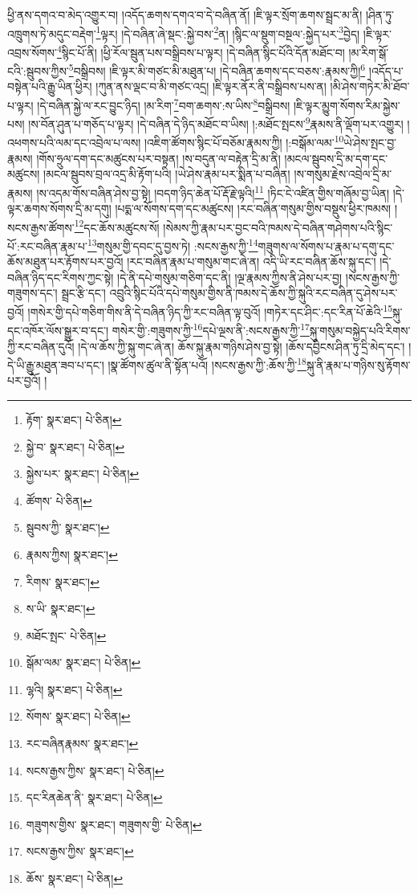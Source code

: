 ཕྱི་ནས་དགའ་བ་མེད་འགྱུར་བ། །འདོད་ཆགས་དགའ་བ་དེ་བཞིན་ནོ། །ཇི་ལྟར་སྲོག་ཆགས་སྦྲང་མ་ནི། །ཤིན་ཏུ་འཁྲུགས་ཏེ་མདུང་བརྡེག་\footnote{རྟོག་  སྣར་ཐང་།  པེ་ཅིན། }ལྟར། །དེ་བཞིན་ཞེ་སྡང་:སྐྱེ་བས་\footnote{སྐྱེ་བ་  སྣར་ཐང་།  པེ་ཅིན། }ན། །སྙིང་ལ་སྡུག་བསྔལ་:སྐྱེད་པར་\footnote{སྐྱེས་པར་  སྣར་ཐང་།  པེ་ཅིན། }བྱེད། །ཇི་ལྟར་འབྲས་སོགས་\footnote{ཚོགས་  པེ་ཅིན། }སྙིང་པོ་ནི། །ཕྱི་རོལ་སྦུན་པས་བསྒྲིབས་པ་ལྟར། །དེ་བཞིན་སྙིང་པོའི་དོན་མཐོང་བ། །མ་རིག་སྒོ་ངའི་:སྦུབས་ཀྱིས་\footnote{སྦུབས་ཀྱི་  སྣར་ཐང་། }བསྒྲིབས། །ཇི་ལྟར་མི་གཙང་མི་མཐུན་པ། །དེ་བཞིན་ཆགས་དང་བཅས་:རྣམས་ཀྱི།\footnote{རྣམས་ཀྱིས།  སྣར་ཐང་། } །འདོད་པ་བསྟེན་པའི་རྒྱུ་ཡིན་ཕྱིར། །ཀུན་ནས་ལྡང་བ་མི་གཙང་འདྲ། །ཇི་ལྟར་ནོར་ནི་བསྒྲིབས་པས་ན། །མི་ཤེས་གཏེར་མི་ཐོབ་པ་ལྟར། །དེ་བཞིན་སྐྱེ་ལ་རང་བྱུང་ཉིད། །མ་རིག་\footnote{རིགས་  སྣར་ཐང་། }བག་ཆགས་:ས་ཡིས་\footnote{ས་ཡི་  སྣར་ཐང་། }བསྒྲིབས། །ཇི་ལྟར་མྱུག་སོགས་རིམ་སྐྱེས་པས། །ས་བོན་ཤུན་པ་གཅོད་པ་ལྟར། །དེ་བཞིན་དེ་ཉིད་མཐོང་བ་ཡིས། །:མཐོང་སྤངས་\footnote{མཐོང་སྤང་  པེ་ཅིན། }རྣམས་ནི་ལྡོག་པར་འགྱུར། །འཕགས་པའི་ལམ་དང་འབྲེལ་པ་ལས། །འཇིག་ཚོགས་སྙིང་པོ་བཅོམ་རྣམས་ཀྱི། །:བསྒོམ་ལམ་\footnote{སྒོམ་ལམ་  སྣར་ཐང་།  པེ་ཅིན། }ཡེ་ཤེས་སྤང་བྱ་རྣམས། །གོས་ཧྲུལ་དག་དང་མཚུངས་པར་བསྟན། །ས་བདུན་ལ་བརྟེན་དྲི་མ་ནི། །མངལ་སྦུབས་དྲི་མ་དག་དང་མཚུངས། །མངལ་སྦུབས་བྲལ་འདྲ་མི་རྟོག་པའི། །ཡེ་ཤེས་རྣམ་པར་སྨིན་པ་བཞིན། །ས་གསུམ་རྗེས་འབྲེལ་དྲི་མ་རྣམས། །ས་འདམ་གོས་བཞིན་ཤེས་བྱ་སྟེ། །བདག་ཉིད་ཆེན་པོ་རྡོ་རྗེ་ལྟའི།\footnote{ལྷའི།  སྣར་ཐང་།  པེ་ཅིན། } །ཏིང་ངེ་འཛིན་གྱིས་གཞོམ་བྱ་ཡིན། །དེ་ལྟར་ཆགས་སོགས་དྲི་མ་དགུ། །པདྨ་ལ་སོགས་དག་དང་མཚུངས། །རང་བཞིན་གསུམ་གྱིས་བསྡུས་ཕྱིར་ཁམས། །སངས་རྒྱས་ཚོགས་\footnote{སོགས་  སྣར་ཐང་།  པེ་ཅིན། }དང་ཆོས་མཚུངས་སོ། །སེམས་ཀྱི་རྣམ་པར་བྱང་བའི་ཁམས་དེ་བཞིན་གཤེགས་པའི་སྙིང་པོ་:རང་བཞིན་རྣམ་པ་\footnote{རང་བཞིནརྣམས་  སྣར་ཐང་། }གསུམ་གྱི་དབང་དུ་བྱས་ཏེ། :སངས་རྒྱས་ཀྱི་\footnote{སངས་རྒྱས་ཀྱིས་  སྣར་ཐང་།  པེ་ཅིན། }གཟུགས་ལ་སོགས་པ་རྣམ་པ་དགུ་དང་ཆོས་མཐུན་པར་རྟོགས་པར་བྱའོ། །རང་བཞིན་རྣམ་པ་གསུམ་གང་ཞེ་ན། འདི་ཡི་རང་བཞིན་ཆོས་སྐུ་དང་། །དེ་བཞིན་ཉིད་དང་རིགས་ཀྱང་སྟེ། །དེ་ནི་དཔེ་གསུམ་གཅིག་དང་ནི། །ལྔ་རྣམས་ཀྱིས་ནི་ཤེས་པར་བྱ། །སངས་རྒྱས་ཀྱི་གཟུགས་དང་། སྦྲང་རྩི་དང་། འབྲུའི་སྙིང་པོའི་དཔེ་གསུམ་གྱིས་ནི་ཁམས་དེ་ཆོས་ཀྱི་སྐུའི་རང་བཞིན་དུ་ཤེས་པར་བྱའོ། །གསེར་གྱི་དཔེ་གཅིག་གིས་ནི་དེ་བཞིན་ཉིད་ཀྱི་རང་བཞིན་ལྟ་བུའོ། །གཏེར་དང་ཤིང་:དང་རིན་པོ་ཆེའི་\footnote{དང་རིནཆེན་ནི་  སྣར་ཐང་།  པེ་ཅིན། }སྐུ་དང་འཁོར་ལོས་སྒྱུར་བ་དང་། གསེར་གྱི་:གཟུགས་ཀྱི་\footnote{གཟུགས་གྱིས་  སྣར་ཐང་། གཟུགས་གྱི་  པེ་ཅིན། }དཔེ་ལྔས་ནི་:སངས་རྒྱས་ཀྱི་\footnote{སངས་རྒྱས་ཀྱིས་  སྣར་ཐང་། }སྐུ་གསུམ་བསྐྱེད་པའི་རིགས་ཀྱི་རང་བཞིན་དུའོ། །དེ་ལ་ཆོས་ཀྱི་སྐུ་གང་ཞེ་ན། ཆོས་སྐུ་རྣམ་གཉིས་ཤེས་བྱ་སྟེ། །ཆོས་དབྱིངས་ཤིན་ཏུ་དྲི་མེད་དང་། །དེ་ཡི་རྒྱུ་མཐུན་ཟབ་པ་དང་། །སྣ་ཚོགས་ཚུལ་ནི་སྟོན་པའོ། །སངས་རྒྱས་ཀྱི་:ཆོས་ཀྱི་\footnote{ཆོས་  སྣར་ཐང་།  པེ་ཅིན། }སྐུ་ནི་རྣམ་པ་གཉིས་སུ་རྟོགས་པར་བྱའོ། །
